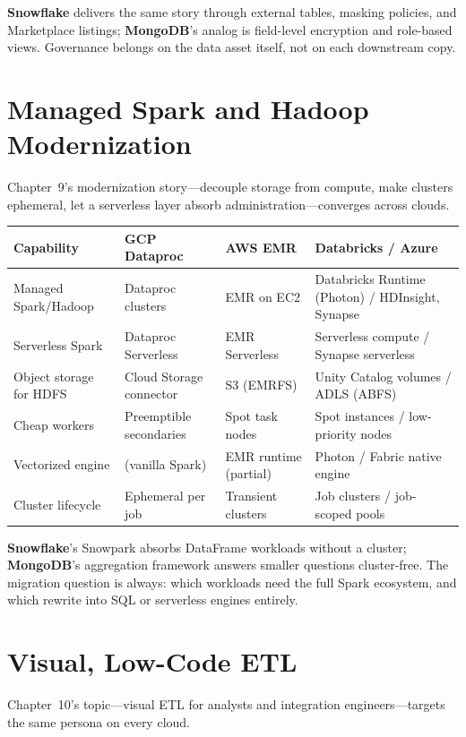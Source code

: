 \noindent \textbf{Snowflake} delivers the same story through external tables, masking policies, and
Marketplace listings; \textbf{MongoDB}'s analog is field-level encryption and role-based views.
Governance belongs on the data asset itself, not on each downstream copy.

\section{Managed Spark and Hadoop Modernization}
%
Chapter~9's modernization story---decouple storage from compute, make clusters ephemeral, let a
serverless layer absorb administration---converges across clouds.

\begin{center}
\footnotesize
\begin{tabular}{@{}p{2.8cm}p{3.0cm}p{3.0cm}p{3.4cm}@{}}
\toprule
\textbf{Capability} & \textbf{GCP Dataproc} & \textbf{AWS EMR} & \textbf{Databricks / Azure} \\
\midrule
Managed Spark/Hadoop & Dataproc clusters & EMR on EC2 & Databricks Runtime (Photon) / HDInsight, Synapse \\
Serverless Spark & Dataproc Serverless & EMR Serverless & Serverless compute / Synapse serverless \\
Object storage for HDFS & Cloud Storage connector & S3 (EMRFS) & Unity Catalog volumes / ADLS (ABFS) \\
Cheap workers & Preemptible secondaries & Spot task nodes & Spot instances / low-priority nodes \\
Vectorized engine & (vanilla Spark) & EMR runtime (partial) & Photon / Fabric native engine \\
Cluster lifecycle & Ephemeral per job & Transient clusters & Job clusters / job-scoped pools \\
\bottomrule
\end{tabular}
\end{center}

\noindent \textbf{Snowflake}'s Snowpark absorbs DataFrame workloads without a cluster;
\textbf{MongoDB}'s aggregation framework answers smaller questions cluster-free. The migration
question is always: which workloads need the full Spark ecosystem, and which rewrite into SQL or
serverless engines entirely.

\section{Visual, Low-Code ETL}
%
Chapter~10's topic---visual ETL for analysts and integration engineers---targets the same persona
on every cloud.

